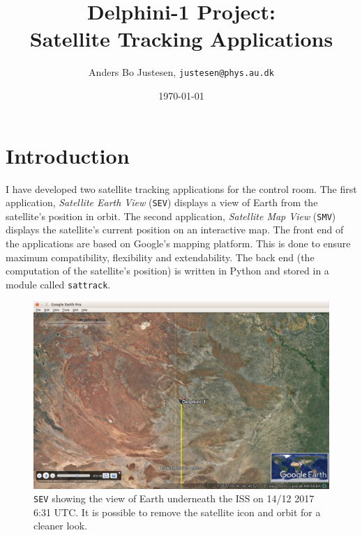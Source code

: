 \documentclass[10pt,a4paper]{article}
\author{Anders Bo Justesen, \texttt{justesen@phys.au.dk}}
\title{\vspace{-3cm} Delphini-1 Project:\\Satellite Tracking Applications}
\date{\today}
\begin{document}
\maketitle

\section{Introduction}
I have developed two satellite tracking applications for the control room. The first application, \textit{Satellite Earth View} (\texttt{SEV}) displays a view of Earth from the satellite's position in orbit. The second application, \textit{Satellite Map View} (\texttt{SMV}) displays the satellite's current position on an interactive map. The front end of the applications are based on Google's mapping platform. This is done to ensure maximum compatibility, flexibility and extendability. The back end (the computation of the satellite's position) is written in Python and stored in a module called \texttt{sattrack}.

\begin{figure}
\includegraphics[width=\textwidth]{../Playing.png}
\caption{\texttt{SEV} showing the view of Earth underneath the ISS on 14/12 2017 6:31 UTC. It is possible to remove the satellite icon and orbit for a cleaner look.}
\label{Fig:SEV}
\end{figure}
\end{document}
